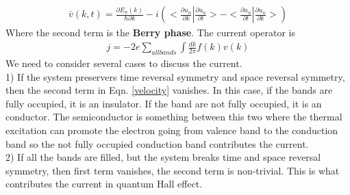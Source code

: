 \documentclass[a4paper]{article}
\begin{document}
\begin{align}\label{velocity}
	\bar v(k,t) = \frac{\partial E_n(k)}{\hbar \partial k} 
	- i  (<\frac{\partial u_n}{\partial k}| \frac{\partial u_n}{\partial t}> -<\frac{\partial u_n}{\partial t}| \frac{\partial u_n}{\partial k}>)
\end{align}
Where the second term is the {\bf Berry phase}.
The current operator is
\begin{align*}
	j = -2e\sum_{all bands}\int\frac{dk}{2 \pi} f(k)v(k)
\end{align*}
We need to consider several cases to discuss the current.\\
1) If the system preservers time reversal symmetry and space reversal symmetry, then the second term in Eqn. \ref{velocity} vanishes. In this case, if the bands are fully occupied, it is an insulator. If the band are not fully occupied, it is an conductor. The semiconductor is something between this two where the thermal excitation can promote the electron going from valence band to the conduction band so the not fully occupied conduction band contributes the current.\\
2) If all the bands are filled, but the system breaks time and space reversal symmetry, then first term vanishes, the second term is non-trivial. This is what contributes the current in quantum Hall effect.\\
\end{document}
